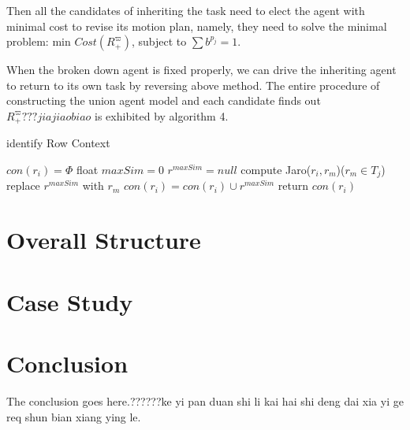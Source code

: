 \documentclass[journal]{IEEEtran}
\begin{document}
Then all the candidates of inheriting the task need to elect the agent with minimal cost to revise its motion plan, namely, they need to solve the minimal problem: min $Cost(R^{\varpi}_+)$, subject to $\sum b^{p_j}=1$.\par
When the broken down agent is fixed properly, we can drive the inheriting agent to return to its own task by reversing above method. The entire procedure of constructing the union agent model and each candidate finds out $R^{\varpi}_+???jia jiao biao$ is exhibited by algorithm 4.

\begin{algorithm}
  \caption{identify Row Context}
  $con(r_i)= \Phi$\;
  {
    float $maxSim=0$\;
    $r^{maxSim}=null$\;
    {
      compute Jaro($r_i,r_m$)($r_m\in T_j$)\;
      {
        replace $r^{maxSim}$ with $r_m$\;
      }
    }
    $con(r_i)=con(r_i)\cup {r^{maxSim}}$\;
  }
  return $con(r_i)$\;
\end{algorithm}

\section{Overall Structure}

\section{Case Study}

\section{Conclusion}
The conclusion goes here.??????ke yi pan duan shi li kai hai shi deng dai xia yi ge req shun bian xiang ying le.





\end{document}
